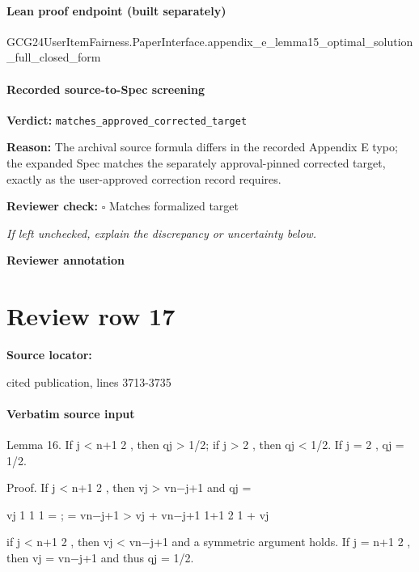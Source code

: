 \documentclass[10pt]{article}
\newcommand{\reviewerbox}{%
  \par\noindent\fbox{\parbox{0.96\linewidth}{\rule{0pt}{0.38in}}}\par
}
\newcommand{\reviewmatch}[1]{%
  \par\noindent\textbf{Reviewer check:} $\square$\; #1\par
  \noindent\emph{If left unchecked, explain the discrepancy or uncertainty below.}\par
}
\begin{document}
\paragraph{Lean proof endpoint (built separately)}\begin{ReviewVerbatim}
GCG24UserItemFairness.PaperInterface.appendix_e_lemma15_optimal_solution_full_closed_form
\end{ReviewVerbatim}

\paragraph{Recorded source-to-Spec screening}
\textbf{Verdict:} \texttt{matches\_approved\_corrected\_target}
\\
{\raggedright
\textbf{Reason:} The archival source formula differs in the recorded Appendix E typo;\allowbreak{} the expanded Spec matches the separately approval-\allowbreak{}pinned corrected target, exactly as the user-\allowbreak{}approved correction record requires.\allowbreak{}
\par}
\reviewmatch{Matches formalized target}
\noindent\textbf{Reviewer annotation}\par
\reviewerbox
\clearpage
\hypertarget{source-claim-fa20503a4cc73d27}{}
\section*{Review row 17}
\textbf{Source locator:} {\footnotesize\raggedright cited publication, lines 3713-\allowbreak{}3735\par}
\paragraph{Verbatim source input}
\begin{ReviewVerbatim}
Lemma 16. If j < n+1
2 , then qj > 1/2; if j > 2 , then qj < 1/2. If j = 2 , qj = 1/2.

Proof. If j < n+1
2 , then vj > vn−j+1 and
qj =

vj
1
1
1
= ;
=
vn−j+1 >
vj + vn−j+1
1+1
2
1 + vj

if j < n+1
2 , then vj < vn−j+1 and a symmetric argument holds.
If j = n+1
2 , then vj = vn−j+1 and thus qj = 1/2.
\end{ReviewVerbatim}
\end{document}
